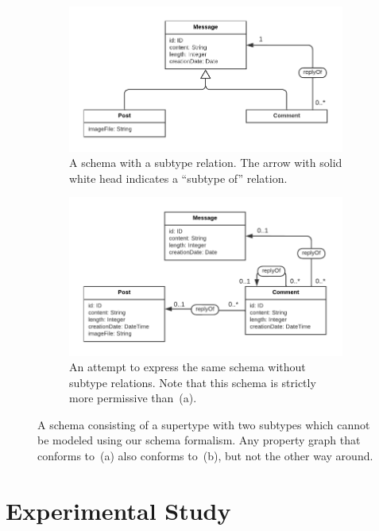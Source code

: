 \documentclass{article}
\theoremstyle{definition}
\begin{document}
\begin{figure}[t]
  \centering
  \begin{subfigure}[t]{0.45\textwidth}
    \centering
    \includegraphics[width=\textwidth]{figures/subtyping.pdf}
    \caption{A schema with a subtype relation. The arrow with solid white head indicates a ``subtype of'' relation.}
    \label{fig:subtyping}
  \end{subfigure}
  \hfill
  \begin{subfigure}[t]{0.45\textwidth}
    \centering
    \includegraphics[width=\textwidth]{figures/subtyping-ours.pdf}
    \caption{An attempt to express the same schema without subtype relations. Note that this schema is strictly more permissive than~(a).}
    \label{fig:subtyping-ours}
  \end{subfigure}
  \caption{A schema consisting of a supertype with two subtypes which cannot be modeled using our schema formalism. Any property graph that conforms to~(a) also conforms to~(b), but not the other way around.}
\end{figure}

\section{Experimental Study}
\label{sec:experiment}
\end{document}
